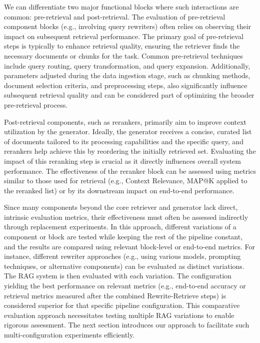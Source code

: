 We can differentiate two major functional blocks where such interactions are common: pre-retrieval and post-retrieval. The evaluation of pre-retrieval component blocks (e.g., involving query rewriters) often relies on observing their impact on subsequent retrieval performance. The primary goal of pre-retrieval steps is typically to enhance retrieval quality, ensuring the retriever finds the necessary documents or chunks for the task. Common pre-retrieval techniques include query routing, query transformation, and query expansion. Additionally, parameters adjusted during the data ingestion stage, such as chunking methods, document selection criteria, and preprocessing steps, also significantly influence subsequent retrieval quality and can be considered part of optimizing the broader pre-retrieval process.

Post-retrieval components, such as rerankers, primarily aim to improve context utilization by the generator. Ideally, the generator receives a concise, curated list of documents tailored to its processing capabilities and the specific query, and rerankers help achieve this by reordering the initially retrieved set. Evaluating the impact of this reranking step is crucial as it directly influences overall system performance. The effectiveness of the reranker block can be assessed using metrics similar to those used for retrieval (e.g., Context Relevance, MAP@K applied to the reranked list) or by its downstream impact on end-to-end performance.

Since many components beyond the core retriever and generator lack direct, intrinsic evaluation metrics, their effectiveness must often be assessed indirectly through replacement experiments. In this approach, different variations of a component or block are tested while keeping the rest of the pipeline constant, and the results are compared using relevant block-level or end-to-end metrics. For instance, different rewriter approaches (e.g., using various models, prompting techniques, or alternative components) can be evaluated as distinct variations. The RAG system is then evaluated with each variation. The configuration yielding the best performance on relevant metrics (e.g., end-to-end accuracy or retrieval metrics measured after the combined Rewrite-Retrieve steps) is considered superior for that specific pipeline configuration. This comparative evaluation approach necessitates testing multiple RAG variations to enable rigorous assessment. The next section introduces our approach to facilitate such multi-configuration experiments efficiently.

